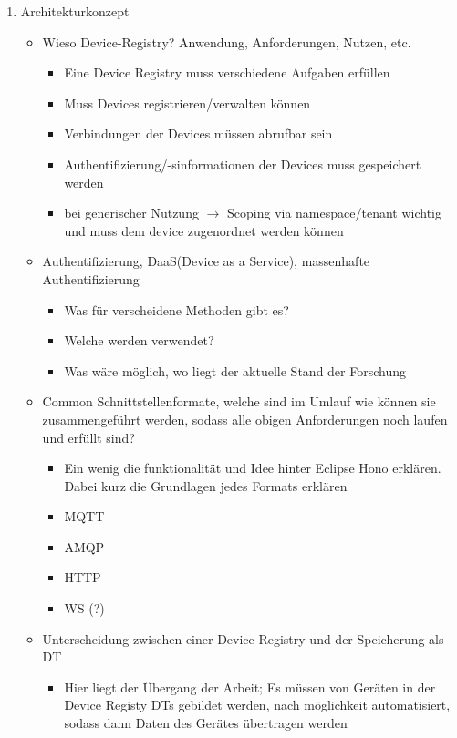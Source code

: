 \begin{enumerate}
    \item Architekturkonzept
    \begin{itemize}
        \item Wieso Device-Registry? Anwendung, Anforderungen, Nutzen, etc.
        \begin{itemize}
            \item Eine Device Registry muss verschiedene Aufgaben erfüllen
            \item Muss Devices registrieren/verwalten können
            \item Verbindungen der Devices müssen abrufbar sein
            \item Authentifizierung/-sinformationen der Devices muss gespeichert werden
            \item bei generischer Nutzung $\rightarrow$ Scoping via namespace/tenant wichtig und muss dem device zugenordnet werden können
        \end{itemize}
        \item Authentifizierung, DaaS(Device as a Service), massenhafte Authentifizierung
        \begin{itemize}
            \item Was für verscheidene Methoden gibt es?
            \item Welche werden verwendet?
            \item Was wäre möglich, wo liegt der aktuelle Stand der Forschung
        \end{itemize}
        \item Common Schnittstellenformate, welche sind im Umlauf wie können sie zusammengeführt werden, sodass alle obigen Anforderungen noch laufen und erfüllt sind?
        \begin{itemize}
            \item Ein wenig die funktionalität und Idee hinter Eclipse Hono erklären. Dabei kurz die Grundlagen jedes Formats erklären
            \item MQTT
            \item AMQP
            \item HTTP
            \item WS (?)
        \end{itemize}
        \item Unterscheidung zwischen einer Device-Registry und der Speicherung als DT
        \begin{itemize}
            \item Hier liegt der Übergang der Arbeit; Es müssen von Geräten in der Device Registy DTs gebildet werden, nach möglichkeit automatisiert, sodass dann Daten des Gerätes übertragen werden

\end{itemize}
\end{itemize}
\end{enumerate}
